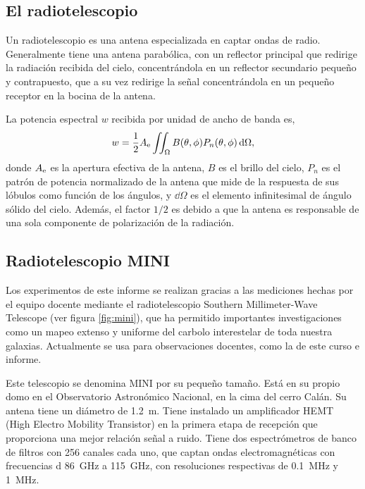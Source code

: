 \subsection{El radiotelescopio}\label{sec:radiotelescopio}

Un radiotelescopio es una antena especializada en captar ondas de radio. Generalmente tiene una antena parabólica, con un reflector principal que redirige la radiación recibida del cielo, concentrándola en un reflector secundario pequeño y contrapuesto, que a su vez redirige la señal concentrándola en un pequeño receptor en la bocina de la antena.

La potencia espectral $w$ recibida por unidad de ancho de banda es,
\begin{equation}
w=\frac{1}{2}A_\textnormal{e}\iint_\Omega{B(\theta,\phi)P_n(\theta,\phi)\dd{\Omega}}\label{eq:w}
	,\end{equation}
donde $A_\textnormal{e}$ es la apertura efectiva de la antena, $B$ es el brillo del cielo, $P_n$ es el patrón de potencia normalizado de la antena que mide de la respuesta de sus lóbulos como función de los ángulos, y $\dd{\Omega}$ es el elemento infinitesimal de ángulo sólido del cielo. Además, el factor $1/2$ es debido a que la antena es responsable de una sola componente de polarización de la radiación.

\subsection{Radiotelescopio MINI}\label{sec:mini}

Los experimentos de este informe se realizan gracias a las mediciones hechas por el equipo docente mediante el radiotelescopio Southern Millimeter-Wave Telescope (ver figura \ref{fig:mini}), que ha permitido importantes investigaciones como un mapeo extenso y uniforme del carbolo interestelar de toda nuestra galaxias. Actualmente se usa para observaciones docentes, como la de este curso e informe.

Este telescopio se denomina MINI por su pequeño tamaño. Está en su propio domo en el Observatorio Astronómico Nacional, en la cima del cerro Calán. Su antena tiene un diámetro de \SI{1.2}{\meter}. Tiene instalado un amplificador HEMT (High Electro Mobility Transistor) en la primera etapa de recepción que proporciona una mejor relación señal a ruido. Tiene dos espectrómetros de banco de filtros con 256 canales cada uno, que captan ondas electromagnéticas con frecuencias d \SI{86}{\giga\hertz} a \SI{115}{\giga\hertz}, con resoluciones respectivas de \SI{0.1}{\mega\hertz} y \SI{1}{\mega\hertz}.

